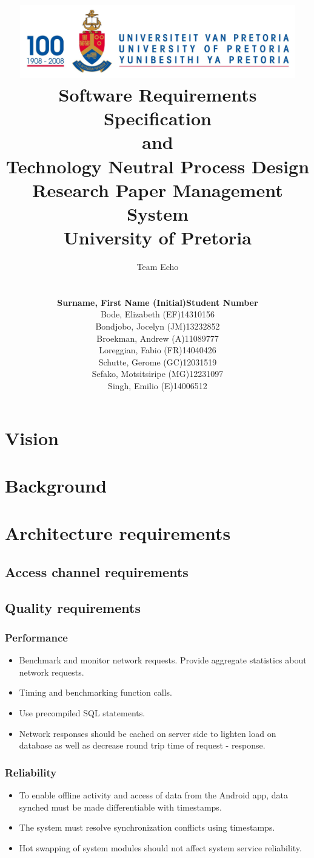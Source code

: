 \documentclass[a4paper,10pt]{article}
\title{\includegraphics[width=12cm]{Eeufeeslogo.jpg} \\
       Software Requirements Specification \\ 
       and \\
       Technology Neutral Process Design \\
       Research Paper Management System \\
       \vspace{0.5cm}
       University of Pretoria \\
       \vspace{1.0cm}
       }
\date{}
\author{Team Echo\\
	\vspace{0.5cm} \\
	\begin{tabu} to \textwidth { X[l] X[l]}
		\hline
		\textbf{Surname, First Name (Initial)}	& \textbf{Student Number}	\\ \hline \hline
		Bode, Elizabeth (EF)			& 14310156		\\ \hline
		Bondjobo, Jocelyn (JM)		& 13232852		\\ \hline
		Broekman, Andrew (A)		& 11089777		\\ \hline
		Loreggian, Fabio (FR)			& 14040426		\\ \hline
		Schutte, Gerome (GC)		& 12031519		\\ \hline
		Sefako, Motsitsiripe (MG)		& 12231097		\\ \hline
		Singh, Emilio (E)			& 14006512		\\ \hline
		\hline
	\end{tabu}}
\begin{document}
\clearpage
\maketitle
\thispagestyle{empty}

\newpage
{}

\tableofcontents

\newpage
{}

\section{Vision}

\section{Background}

\section{Architecture requirements}
\subsection{Access channel requirements}

\subsection{Quality requirements}
\subsubsection{Performance}
\begin{itemize}
\item Benchmark and monitor network requests. Provide aggregate statistics about network requests.
\item Timing and benchmarking function calls.
\item Use precompiled SQL statements.
\item Network responses should be cached on server side to lighten load on database as well as decrease round trip time of request - response.
\end{itemize}

\subsubsection{Reliability}
\begin{itemize}
\item To enable offline activity and access of data from the Android app, data synched must be made differentiable with timestamps.
\item The system must resolve synchronization conflicts using timestamps.
\item Hot swapping of system modules should not affect system service reliability.
\end{itemize}
\end{document}
